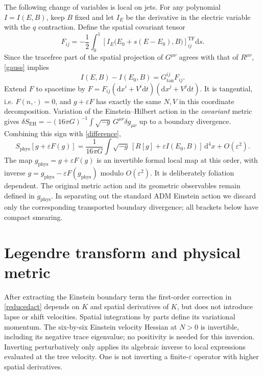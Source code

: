 \documentclass[11pt]{article}
\newcommand{\TF}{\mathop{\mathrm{TF}}}
\newcommand{\dd}{\mathrm d}
\newcommand{\PG}{16\pi G}
\newcommand{\ep}{\varepsilon}
\begin{document}
The following change of variables is local on jets. For any polynomial \(I=I(E,B)\), keep \(B\) fixed and let \(I_E\) be the derivative in the electric variable with the \(q\) contraction. Define the spatial covariant tensor
\begin{equation}
 F_{ij}=-\frac12\int_0^1
  \left[I_E\bigl(E_0+s(E-E_0),B\bigr)\right]^{\TF}_{ij}\dd s .
 \label{F}
\end{equation}
Since the tracefree part of the spatial projection of \(G^{\mu\nu}\) agrees with that of \(R^{\mu\nu}\), \eqref{gauss} implies
\begin{equation}
 I(E,B)-I(E_0,B)=G^{ij}_{\mathrm{tan}}F_{ij}.
 \label{difference}
\end{equation}
Extend \(F\) to spacetime by \(F=F_{ij}(\dd x^i+V^i\dd t)(\dd x^j+V^j\dd t)\).
It is tangential, i.e. \(F(n,\cdot)=0\), and \(g+\ep F\) has exactly the same \(N,V\) in this coordinate decomposition. Variation of the Einstein--Hilbert action in the \emph{covariant} metric gives
\(
 \delta S_{\mathrm{EH}}=-(\PG)^{-1}\int \sqrt{-g}\,G^{\mu\nu}\delta g_{\mu\nu}
\)
up to a boundary divergence. Combining this sign with \eqref{difference},
\begin{equation}
 S_{\mathrm{phys}}[g+\ep F(g)]
 =\frac{1}{\PG}\int\sqrt{-g}\,
       [R[g]+\ep I(E_0,B)]\,\dd^4x+O(\ep^2).
 \label{reducedact}
\end{equation}
The map \(g_{\mathrm{phys}}=g+\ep F(g)\) is an invertible formal local map at this order, with inverse \(g=g_{\mathrm{phys}}-\ep F(g_{\mathrm{phys}})\) modulo \(O(\ep^2)\). It is deliberately foliation dependent. The original metric action and its geometric observables remain defined in \(g_{\mathrm{phys}}\). In separating out the standard ADM Einstein action we discard only the corresponding transported boundary divergence; all brackets below have compact smearing.

\section{Legendre transform and physical metric}
After extracting the Einstein boundary term the first-order correction in \eqref{reducedact} depends on \(K\) and spatial derivatives of \(K\), but does not introduce lapse or shift velocities. Spatial integrations by parts define its variational momentum. The six-by-six Einstein velocity Hessian at \(N>0\) is invertible, including its negative trace eigenvalue; no positivity is needed for this inversion. Inverting perturbatively only applies its algebraic inverse to local expressions evaluated at the tree velocity. One is not inverting a finite-\(\ep\) operator with higher spatial derivatives.
\end{document}
